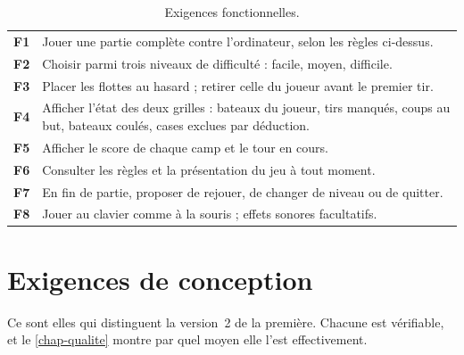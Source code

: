 \begin{table}[ht]
    \centering
    \begin{tabularx}{\textwidth}{@{}lX@{}}
        \toprule
        \textbf{F1} & Jouer une partie complète contre l'ordinateur, selon les règles ci-dessus.   \\
        \textbf{F2} & Choisir parmi trois niveaux de difficulté : facile, moyen, difficile.        \\
        \textbf{F3} & Placer les flottes au hasard ; retirer celle du joueur avant le premier tir. \\
        \textbf{F4} & Afficher l'état des deux grilles : bateaux du joueur, tirs manqués, coups
        au but, bateaux coulés, cases exclues par déduction.                                       \\
        \textbf{F5} & Afficher le score de chaque camp et le tour en cours.                        \\
        \textbf{F6} & Consulter les règles et la présentation du jeu à tout moment.                \\
        \textbf{F7} & En fin de partie, proposer de rejouer, de changer de niveau ou de quitter.   \\
        \textbf{F8} & Jouer au clavier comme à la souris ; effets sonores facultatifs.             \\
        \bottomrule
    \end{tabularx}
    \caption{Exigences fonctionnelles.}
    \label{tab-fonctionnelles}
\end{table}

\section{Exigences de conception}

Ce sont elles qui distinguent la version~2 de la première. Chacune est vérifiable, et le
\cref{chap-qualite} montre par quel moyen elle l'est effectivement.

